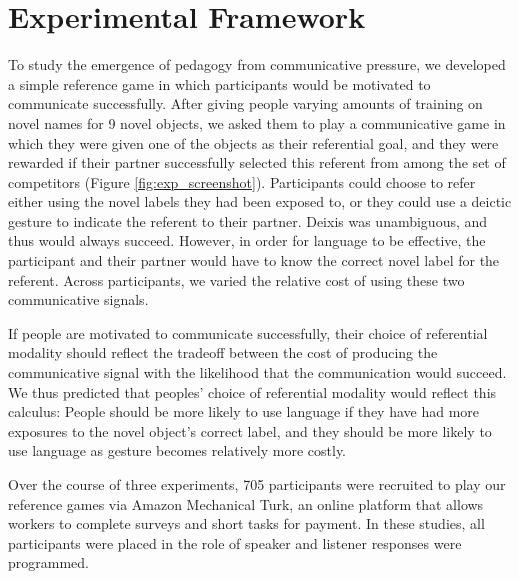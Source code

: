 \documentclass[10pt, letterpaper]{article}
\begin{document}
\section{Experimental Framework}\label{experimental-framework}

To study the emergence of pedagogy from communicative pressure, we
developed a simple reference game in which participants would be
motivated to communicate successfully. After giving people varying
amounts of training on novel names for 9 novel objects, we asked them to
play a communicative game in which they were given one of the objects as
their referential goal, and they were rewarded if their partner
successfully selected this referent from among the set of competitors
(Figure \ref{fig:exp_screenshot}). Participants could choose to refer
either using the novel labels they had been exposed to, or they could
use a deictic gesture to indicate the referent to their partner. Deixis
was unambiguous, and thus would always succeed. However, in order for
language to be effective, the participant and their partner would have
to know the correct novel label for the referent. Across participants,
we varied the relative cost of using these two communicative signals.

If people are motivated to communicate successfully, their choice of
referential modality should reflect the tradeoff between the cost of
producing the communicative signal with the likelihood that the
communication would succeed. We thus predicted that peoples' choice of
referential modality would reflect this calculus: People should be more
likely to use language if they have had more exposures to the novel
object's correct label, and they should be more likely to use language
as gesture becomes relatively more costly.

Over the course of three experiments, 705 participants were recruited to
play our reference games via Amazon Mechanical Turk, an online platform
that allows workers to complete surveys and short tasks for payment. In
these studies, all participants were placed in the role of speaker and
listener responses were programmed.
\end{document}
